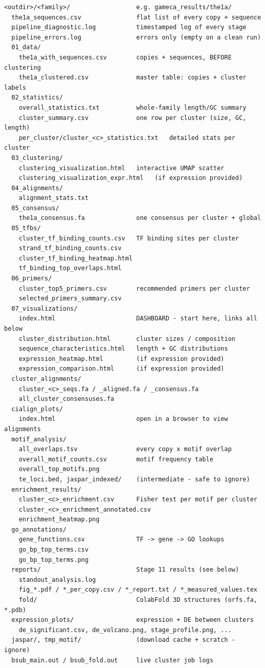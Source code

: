 \documentclass[11pt]{article}
\begin{document}
\begin{lstlisting}
<outdir>/<family>/                  e.g. gameca_results/the1a/
  the1a_sequences.csv               flat list of every copy + sequence
  pipeline_diagnostic.log           timestamped log of every stage
  pipeline_errors.log               errors only (empty on a clean run)
  01_data/
    the1a_with_sequences.csv        copies + sequences, BEFORE clustering
    the1a_clustered.csv             master table: copies + cluster labels
  02_statistics/
    overall_statistics.txt          whole-family length/GC summary
    cluster_summary.csv             one row per cluster (size, GC, length)
    per_cluster/cluster_<c>_statistics.txt   detailed stats per cluster
  03_clustering/
    clustering_visualization.html   interactive UMAP scatter
    clustering_visualization_expr.html   (if expression provided)
  04_alignments/
    alignment_stats.txt
  05_consensus/
    the1a_consensus.fa              one consensus per cluster + global
  05_tfbs/
    cluster_tf_binding_counts.csv   TF binding sites per cluster
    strand_tf_binding_counts.csv
    cluster_tf_binding_heatmap.html
    tf_binding_top_overlaps.html
  06_primers/
    cluster_top5_primers.csv        recommended primers per cluster
    selected_primers_summary.csv
  07_visualizations/
    index.html                      DASHBOARD - start here, links all below
    cluster_distribution.html       cluster sizes / composition
    sequence_characteristics.html   length + GC distributions
    expression_heatmap.html         (if expression provided)
    expression_comparison.html      (if expression provided)
  cluster_alignments/
    cluster_<c>_seqs.fa / _aligned.fa / _consensus.fa
    all_cluster_consensuses.fa
  cialign_plots/
    index.html                      open in a browser to view alignments
  motif_analysis/
    all_overlaps.tsv                every copy x motif overlap
    overall_motif_counts.csv        motif frequency table
    overall_top_motifs.png
    te_loci.bed, jaspar_indexed/    (intermediate - safe to ignore)
  enrichment_results/
    cluster_<c>_enrichment.csv      Fisher test per motif per cluster
    cluster_<c>_enrichment_annotated.csv
    enrichment_heatmap.png
  go_annotations/
    gene_functions.csv              TF -> gene -> GO lookups
    go_bp_top_terms.csv
    go_bp_top_terms.png
  reports/                          Stage 11 results (see below)
    standout_analysis.log
    fig_*.pdf / *_per_copy.csv / *_report.txt / *_measured_values.tex
    fold/                           ColabFold 3D structures (orfs.fa, *.pdb)
  expression_plots/                 expression + DE between clusters
    de_significant.csv, de_volcano.png, stage_profile.png, ...
  jaspar/, tmp_motif/               (download cache + scratch - ignore)
  bsub_main.out / bsub_fold.out     live cluster job logs
\end{lstlisting}
\end{document}

